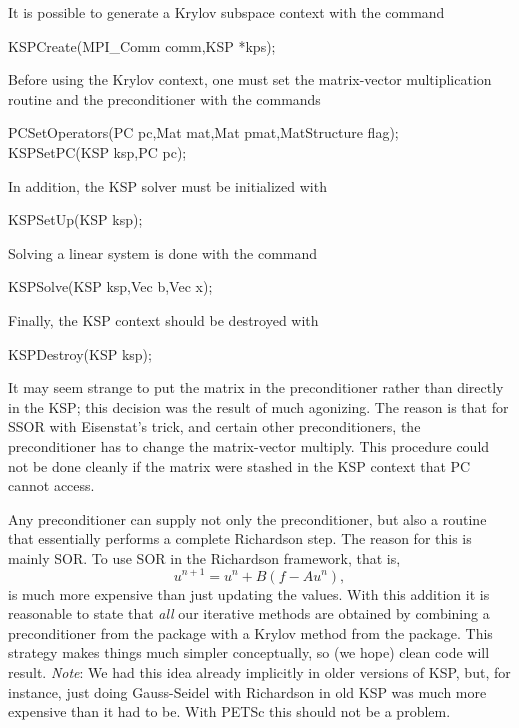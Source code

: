 {{{It is possible to generate a Krylov subspace context with the 
command 
\begin{tabbing}
  KSPCreate(MPI\_Comm comm,KSP *kps);
\end{tabbing}
Before using the Krylov context, one must set the matrix-vector multiplication routine and
the preconditioner with the 
commands  
\begin{tabbing}
  PCSetOperators(PC pc,Mat mat,Mat pmat,MatStructure flag);\\
  KSPSetPC(KSP ksp,PC pc);
\end{tabbing}
In addition, the KSP solver must be initialized with 
\begin{tabbing}
  KSPSetUp(KSP ksp);
\end{tabbing}
Solving a linear system is done with the command 
\begin{tabbing}
  KSPSolve(KSP ksp,Vec b,Vec x);
\end{tabbing}
Finally, the KSP context should be destroyed with 
\begin{tabbing}
  KSPDestroy(KSP ksp);
\end{tabbing}

It may seem strange to put the matrix in the preconditioner rather
than directly in the KSP; this decision was the result of much
agonizing. The reason is that for SSOR with Eisenstat's trick, and 
certain other preconditioners, the
preconditioner has to change the matrix-vector multiply.  This 
procedure could not
be done cleanly if the matrix were stashed in the KSP context that
PC cannot access.

Any preconditioner can supply not 
only the preconditioner, but also a routine that essentially performs a
complete Richardson step. The reason for this is mainly SOR. To 
use SOR in the Richardson framework, that is,
\[
  u^{n+1} = u^{n} + B(f - A u^{n}), 
\]
is much more expensive than just updating the values.
With this addition it is reasonable to state that {\em all} our
iterative methods are obtained by combining a preconditioner from 
the  package with a Krylov method from the 
package. This strategy makes things much simpler conceptually, so 
(we hope)
clean code will result. {\em Note}: We had this idea already implicitly in 
older versions of KSP, but, for instance, just doing Gauss-Seidel
with Richardson in old KSP was much more expensive than it had to be. 
With PETSc this should not be a problem. 

}}}
